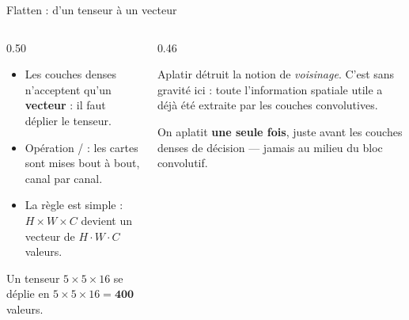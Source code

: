 \begin{frame}{Flatten : d'un tenseur à un vecteur}
\begin{columns}[t]
\begin{column}{0.50\textwidth}
\begin{itemize}
  \item Les couches denses n'acceptent qu'un \textbf{vecteur} : il faut déplier
  le tenseur.
  \item Opération  /  : les cartes sont mises bout à bout,
  canal par canal.
  \item La règle est simple : $H \times W \times C$ devient un vecteur de
  $H \cdot W \cdot C$ valeurs.
\end{itemize}
\begin{ebox}
Un tenseur $5 \times 5 \times 16$ se déplie en $5 \times 5 \times 16 = \mathbf{400}$
valeurs.
\end{ebox}
\end{column}
\begin{column}{0.46\textwidth}
\begin{wbox}
Aplatir détruit la notion de \emph{voisinage}. C'est sans gravité ici : toute
l'information spatiale utile a déjà été extraite par les couches convolutives.
\end{wbox}
\begin{kbox}
On aplatit \textbf{une seule fois}, juste avant les couches denses de décision ---
jamais au milieu du bloc convolutif.
\end{kbox}
\end{column}
\end{columns}
\end{frame}

